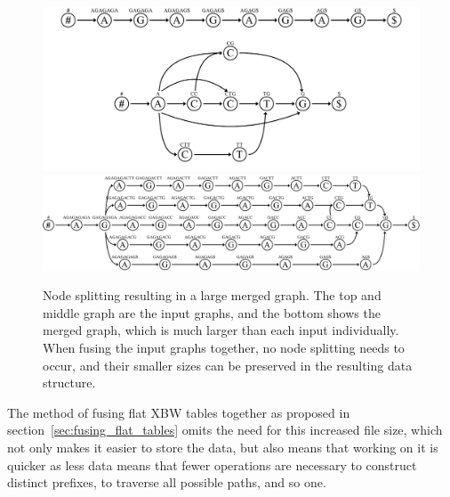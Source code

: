 \documentclass[a4paper,12pt,twoside,BCOR=10mm]{scrbook}
\begin{document}
\begin{figure}[!htb]
\centering
\includegraphics[width=\textwidth]{evo_fig_massive_split.pdf}
\includegraphics[width=\textwidth]{evo_fig_massive_split_3.pdf}
\caption[Node splitting resulting in large merged graph]{Node splitting resulting in a large merged graph. The top and middle graph are the input graphs, and the bottom shows the merged graph, which is much larger than each input individually. When fusing the input graphs together, no node splitting needs to occur, and their smaller sizes can be preserved in the resulting data structure.} \label{fig:evo_fig_massive_split}
\end{figure}

The method of fusing flat XBW tables together as proposed in section~\ref{sec:fusing_flat_tables} omits
the need for this increased file size,
which not only makes it easier to store the data, but also means that working on
it is quicker as less data means that fewer operations are necessary to construct
distinct prefixes, to traverse all possible paths, and so one.
\end{document}
